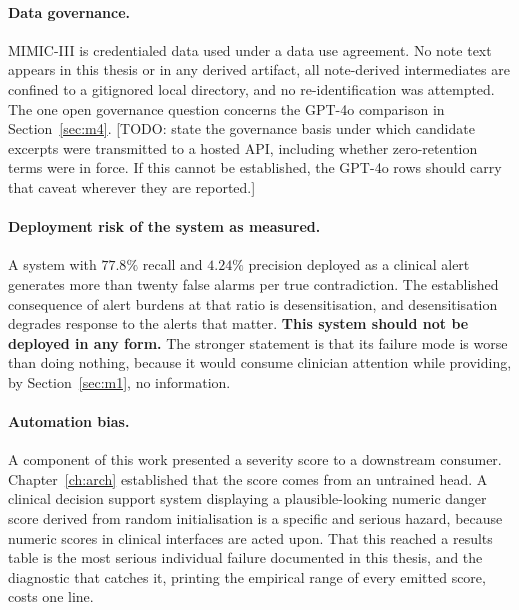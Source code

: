 \paragraph{Data governance.} MIMIC-III is credentialed data used under a data
use agreement. No note text appears in this thesis or in any derived artifact,
all note-derived intermediates are confined to a gitignored local directory, and
no re-identification was attempted. The one open governance question concerns
the GPT-4o comparison in Section~\ref{sec:m4}. [TODO: state the governance basis
under which candidate excerpts were transmitted to a hosted API, including
whether zero-retention terms were in force. If this cannot be established, the
GPT-4o rows should carry that caveat wherever they are reported.]

\paragraph{Deployment risk of the system as measured.} A system with $77.8\%$
recall and $4.24\%$ precision deployed as a clinical alert generates more than
twenty false alarms per true contradiction. The established consequence of alert
burdens at that ratio is desensitisation, and desensitisation degrades response
to the alerts that matter. \textbf{This system should not be deployed in any
form.} The stronger statement is that its failure mode is worse than doing
nothing, because it would consume clinician attention while providing, by
Section~\ref{sec:m1}, no information.

\paragraph{Automation bias.} A component of this work presented a severity score
to a downstream consumer. Chapter~\ref{ch:arch} established that the score comes
from an untrained head. A clinical decision support system displaying a
plausible-looking numeric danger score derived from random initialisation is a
specific and serious hazard, because numeric scores in clinical interfaces are
acted upon. That this reached a results table is the most serious individual
failure documented in this thesis, and the diagnostic that catches it, printing
the empirical range of every emitted score, costs one line.

